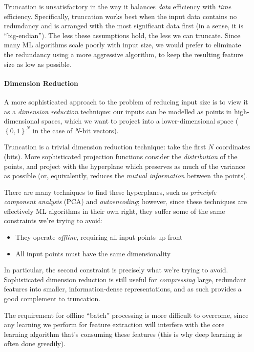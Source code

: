 Truncation is unsatisfactory in the way it balances \emph{data} efficiency with \emph{time} efficiency. Specifically, truncation works best when the input data contains no redundancy and is arranged with the most significant data first (in a sense, it is ``big-endian''). The less these assumptions hold, the less we can truncate. Since many ML algorithms scale poorly with input size, we would prefer to eliminate the redundancy using a more aggressive algorithm, to keep the resulting feature size as low as possible.

\paragraph{Dimension Reduction}

A more sophisticated approach to the problem of reducing input size is to view it as a \emph{dimension reduction} technique: our inputs can be modelled as points in high-dimensional spaces, which we want to project into a lower-dimensional space ($\left\{ {0, 1} \right\}^N$ in the case of $N$-bit vectors).

Truncation is a trivial dimension reduction technique: take the first $N$ coordinates (bits). More sophisticated projection functions consider the \emph{distribution} of the points, and project with the hyperplane which preserves as much of the variance as possible (or, equivalently, reduces the \emph{mutual information} between the points).

There are many techniques to find these hyperplanes, such as \emph{principle component analysis} (PCA) and \emph{autoencoding}; however, since these techniques are effectively ML algorithms in their own right, they suffer some of the same constraints we're trying to avoid:

\begin{itemize}
  \item They operate \emph{offline}, requiring all input points up-front
  \item All input points must have the same dimensionality
\end{itemize}

In particular, the second constraint is precisely what we're trying to avoid. Sophisticated dimension reduction is still useful for \emph{compressing} large, redundant features into smaller, information-dense representations, and as such provides a good complement to truncation.

The requirement for offline ``batch'' processing is more difficult to overcome, since any learning we perform for feature extraction will interfere with the core learning algorithm that's consuming these features (this is why deep learning is often done greedily).

